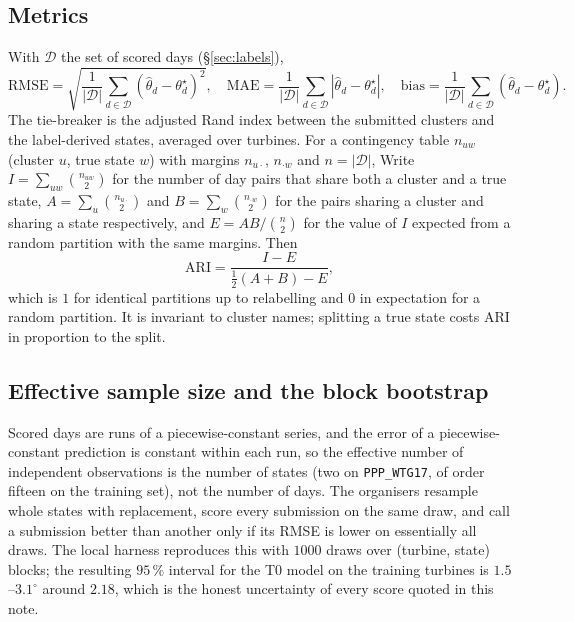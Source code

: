 \documentclass[11pt,a4paper]{article}
\theoremstyle{remark}
\newcommand{\dg}{^{\circ}}
\newcommand{\code}[1]{\texttt{#1}}
\begin{document}
\subsection{Metrics}
With $\mathcal D$ the set of scored days (\S\ref{sec:labels}),
\begin{equation}
  \mathrm{RMSE} = \sqrt{\frac1{|\mathcal D|}\sum_{d\in\mathcal D}(\hat\theta_d-\theta^\star_d)^2},\quad
  \mathrm{MAE} = \frac1{|\mathcal D|}\sum_{d\in\mathcal D}|\hat\theta_d-\theta^\star_d|,\quad
  \mathrm{bias} = \frac1{|\mathcal D|}\sum_{d\in\mathcal D}(\hat\theta_d-\theta^\star_d).
\end{equation}
The tie-breaker is the adjusted Rand index between the submitted clusters and
the label-derived states, averaged over turbines. For a contingency table
$n_{uw}$ (cluster $u$, true state $w$) with margins $n_{u\cdot}$, $n_{\cdot w}$
and $n=|\mathcal D|$,
Write $I=\sum_{uw}\binom{n_{uw}}{2}$ for the number of day pairs that
share both a cluster and a true state, $A=\sum_u\binom{n_{u\cdot}}{2}$ and
$B=\sum_w\binom{n_{\cdot w}}{2}$ for the pairs sharing a cluster and sharing a
state respectively, and $E=AB/\binom n2$ for the value of $I$ expected from a
random partition with the same margins. Then
\begin{equation}
  \mathrm{ARI} = \frac{I - E}{\tfrac12(A+B) - E},
\end{equation}
which is $1$ for identical partitions up to relabelling and $0$ in expectation
for a random partition. It is invariant to cluster names; splitting a true state
costs ARI in proportion to the split.

\subsection{Effective sample size and the block bootstrap}
Scored days are runs of a piecewise-constant series, and the error of a
piecewise-constant prediction is constant within each run, so the effective
number of independent observations is the number of states (two on
\code{PPP\_WTG17}, of order fifteen on the training set), not the number of
days. The organisers resample whole states with replacement, score every
submission on the same draw, and call a submission better than another only if
its RMSE is lower on essentially all draws. The local harness reproduces this
with $1000$ draws over (turbine, state) blocks; the resulting $95\,\%$ interval
for the T0 model on the training turbines is $1.5$--$3.1\dg$ around $2.18$,
which is the honest uncertainty of every score quoted in this note.
\end{document}

